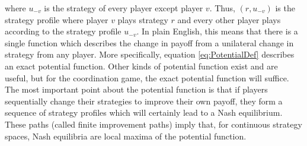 \documentclass{article}
\begin{document}
    where $u_{-v}$ is the strategy of every player except player $v$. Thus, $(r,u_{-v})$ is the strategy profile where player $v$ plays strategy $r$ and every other player plays according to the strategy profile $u_{-v}$.
    In plain English, this means that there is a single function which describes the change in payoff from a unilateral change in strategy from any player. More specifically, equation \eqref{eq:PotentialDef} describes an exact potential function. Other kinds of potential function exist \citep{Quang2016} and are useful, but for the coordination game, the exact potential function will suffice. The most important point about the potential function is that if players sequentially change their strategies to improve their own payoff, they form a sequence of strategy profiles which will certainly lead to a Nash equilibrium. These paths (called finite improvement paths) imply that, for continuous strategy spaces, Nash equilibria are local maxima of the potential function. 
\end{document}
